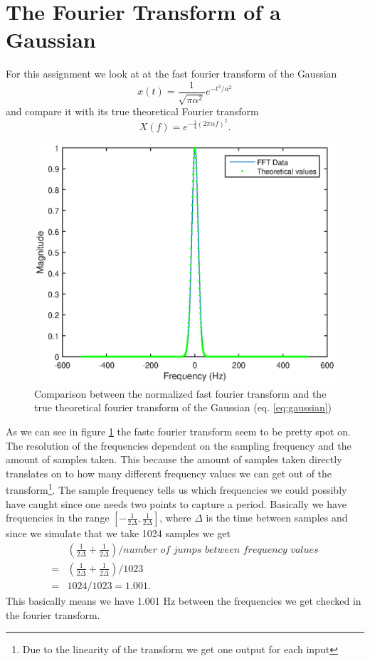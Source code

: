 \documentclass[11pt]{article}
\begin{document}
\section{The Fourier Transform of a Gaussian}
For this assignment we look at at the fast fourier transform of the Gaussian
\begin{equation}
	x(t) = \frac{1}{\sqrt{\pi \alpha^2}} e^{-t^2/\alpha^2}
	\label{eq:gaussian}
\end{equation}
and compare it with its true theoretical Fourier transform
\begin{equation}
	X(f) = e^{-\frac{1}{4} (2 \pi \alpha f)^2}.
	\label{eq:guassianFFT}
\end{equation}
\begin{figure}[H]
	\centering
	\includegraphics[width=1\textwidth]{../ex1/gaussianFFT}
	\caption{Comparison between the normalized fast fourier transform and the true theoretical fourier transform of the Gaussian (eq. \ref{eq:gaussian})}
	\label{fig:gaussianFFT}
\end{figure}

As we can see in figure \ref{fig:gaussianFFT} the fastc fourier transform seem to be pretty spot on. The resolution of the frequencies dependent on the sampling frequency and the amount of samples taken. This because the amount of samples taken directly translates on to how many different frequency values we can get out of the transform\footnote{Due to the linearity of the transform we get one output for each input}. The sample frequency tells us which frequencies we could possibly have caught since one needs two points to capture a period. Basically we have frequencies in the range $[-\frac{1}{2 \Delta},\frac{1}{2 \Delta}]$, where $\Delta$ is the time between samples and since we simulate that we take 1024 samples we get 
\begin{align}
	&(\frac{1}{2 \Delta} +\frac{1}{2 \Delta})/\textit{number of jumps between frequency values} \\ 
	=& (\frac{1}{2\Delta} +\frac{1}{2\Delta})/1023\\
	=& 1024/1023 = 1.001.
\end{align}
This basically means we have 1.001 Hz between the frequencies we get checked in the fourier transform.
\end{document}
